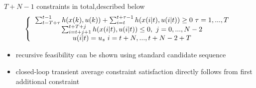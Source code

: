 
$T+N-1$ constraints in total,described below
\begin{equation*}
\left \{
\begin{tabular}{c} 
$\sum_{t-T+\tau}^{t-1} h(x(k),u(k)) + \sum_{i=t}^{t+\tau -1}h(x(i|t), u(i|t)) \geq 0 \ \tau = 1, ..., T$ \\
$\sum_{i=t+j+1}^{t+T+j}h(x(i|t),u(i|t)) \leq 0, \ j =0, ..., N-2$ \\
$u(i|t) = u_s \ i = t+N, ... , t+N-2+T$ 
\end{tabular} 
\right .  
\end{equation*}

\begin{itemize}
\item recursive feasibility can be shown using standard candidate sequence
\item closed-loop transient average constraint satisfaction directly follows from first additional constraint
\end{itemize}